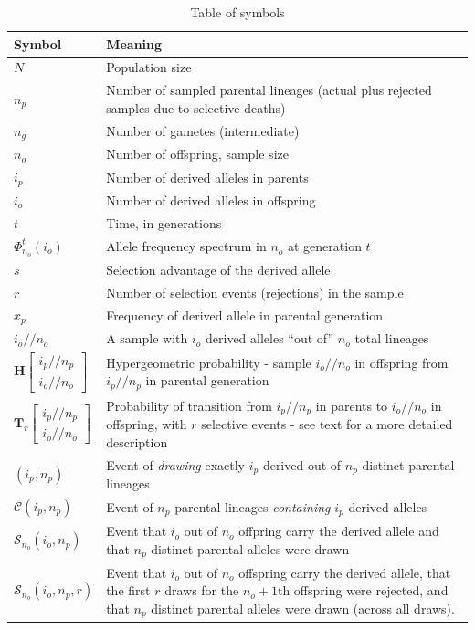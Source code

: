 \documentclass[review]{elsarticle}
\newcommand{\dslash}{/\!\!/}
\newcommand{\Coalc}[4]{\begin{bmatrix}#1\dslash #2 \\ #3\dslash #4 \end{bmatrix}}
\newcommand{\ms}{\mathcal{S}}
\begin{document}
\begin{table}
  \centering
  \begin{tabular}{l|p{100mm}}
    Symbol & Meaning\\
    \hline
    $N$ & Population size\\
    $n_p$ & Number of sampled parental lineages (actual plus rejected samples due to selective deaths)\\
    $n_g$ & Number of gametes (intermediate)\\
    $n_o$ & Number of offspring, sample size\\
    $i_p$ & Number of derived alleles in parents\\
    $i_o$ & Number of derived alleles in offspring\\
    $t$ & Time, in generations\\
    $\Phi_{n_o}^{t}(i_o)$ & Allele frequency spectrum in $n_o$ at generation $t$\\
    $s$ & Selection advantage of the derived allele\\
    $r$ & Number of selection events (rejections) in the sample\\
    $x_p$ & Frequency of derived allele in parental generation\\
    $i_o \dslash n_o$ & A sample with $i_o$ derived alleles ``out of'' $n_o$ total lineages\\
    $\mathbf{H}\Coalc{i_p}{n_p}{i_o}{n_o}$ & Hypergeometric probability -
                                             sample $i_o \dslash n_o$ in offspring from $i_p \dslash n_p$ in parental generation\\
    $\mathbf{T}_{r}\Coalc{i_p}{n_p}{i_o}{n_o}$ & Probability of transition from $i_p \dslash n_p$ in parents
                                                 to $i_o \dslash n_o$ in offspring, with $r$ selective events -
                                                 see text for a more detailed description\\
    \hline
    $(i_p, n_p)$ & Event of \textit{drawing} exactly $i_p$ derived out of $n_p$ distinct parental lineages \\
    $\mathcal{C}(i_p, n_p)$ & Event of $n_p$ parental lineages \textit{containing} $i_p$ derived alleles \\
    $\mathcal{S}_{n_o}(i_o, n_p)$ & Event that  $i_o$ out of $n_o$ offpring carry the derived allele and that $n_p$ distinct parental alleles were drawn \\
    $\ms_{n_o}(i_o, n_p, r)$ & Event that  $i_o$ out of $n_o$ offspring carry the derived allele, that the first $r$ draws for the 
    $n_o+1$th offspring were rejected, 
    and that $n_p$ distinct parental alleles were drawn (across all draws).
  \end{tabular}
  \caption{\label{tab_symbols} Table of symbols}
\end{table}
\end{document}
